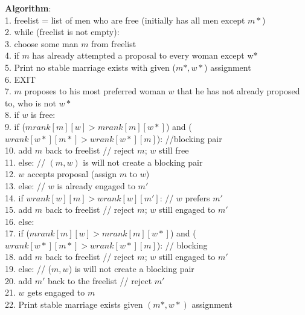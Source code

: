 \documentclass[twoside]{article}
\begin{document}
\textbf{Algorithm}:\\
1. freelist = list of men who are free (initially has all men except $m*$) \\
2. while (freelist is not empty): \\
\hspace*{7mm} 3. choose some man $m$ from freelist \\
\hspace*{7mm} 4. if $m$ has already attempted a proposal to every woman except w* \\
\hspace*{14mm} 5. Print no stable marriage exists with given ($m*, w*$) assignment \\
\hspace*{14mm} 6. EXIT \\
\hspace*{7mm} 7. $m$ proposes to his most preferred woman $w$ that he has not already proposed to, who is not $w*$ \\
\hspace*{7mm} 8. if $w$ is free: \\
\hspace*{14mm} 9. if ($mrank[m][w] > mrank[m][w*]$) and ($wrank[w*][m*] > wrank[w*][m]$): //blocking pair \\
\hspace*{21mm} 10. add $m$ back to freelist // reject $m$; $w$ still free \\ 
\hspace*{14mm} 11. else: // $(m, w)$ is will not create a blocking pair \\
\hspace*{21mm} 12. $w$ accepts proposal (assign $m$ to $w$) \\ 
\hspace*{7mm} 13. else: // $w$ is already engaged to $m'$ \\
\hspace*{14mm} 14. if $wrank[w][m] > wrank[w][m']$: // $w$ prefers $m'$ \\
\hspace*{21mm} 15. add $m$ back to freelist // reject $m$; $w$ still engaged to $m'$ \\
\hspace*{14mm} 16. else: \\
\hspace*{21mm} 17. if ($mrank[m][w] > mrank[m][w*]$) and ($wrank[w*][m*] > wrank[w*][m]$): // blocking \\
\hspace*{28mm} 18. add $m$ back to freelist // reject $m$; $w$ still engaged to $m'$ \\ 
\hspace*{21mm} 19. else: // ($m, w$) is will not create a blocking pair \\
\hspace*{28mm} 20. add $m'$ back to the freelist // reject $m'$ \\ 
\hspace*{28mm} 21. $w$ gets engaged to $m$ \\
22. Print stable marriage exists given $(m*, w*)$ assignment \\
\end{document}

